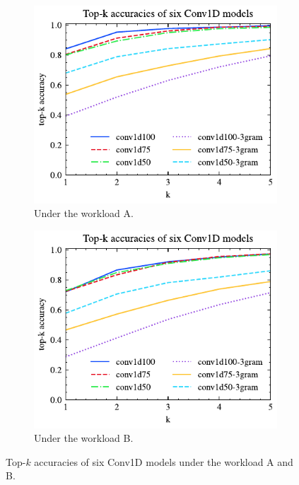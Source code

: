 \documentclass[conference]{IEEEtran}
\begin{document}
\begin{figure}[!th]
	\centering
	\begin{subfigure}{0.45\textwidth}
		\centering
		\includegraphics[]{graphics/top_k_conv1d_A.pdf}
		\caption{Under the workload A.}
		\label{fig:top_k_conv1d_A}
	\end{subfigure}
	\hfill
	\begin{subfigure}{0.45\textwidth}
		\centering
		\includegraphics[]{graphics/top_k_conv1d_B.pdf}
		\caption{Under the workload B.}
		\label{fig:top_k_conv1d_B}
	\end{subfigure}
	\caption{Top-$k$ accuracies of six Conv1D models under the workload A and B.}
	\label{fig:top_k_conv1d_all}
\end{figure}
\end{document}
